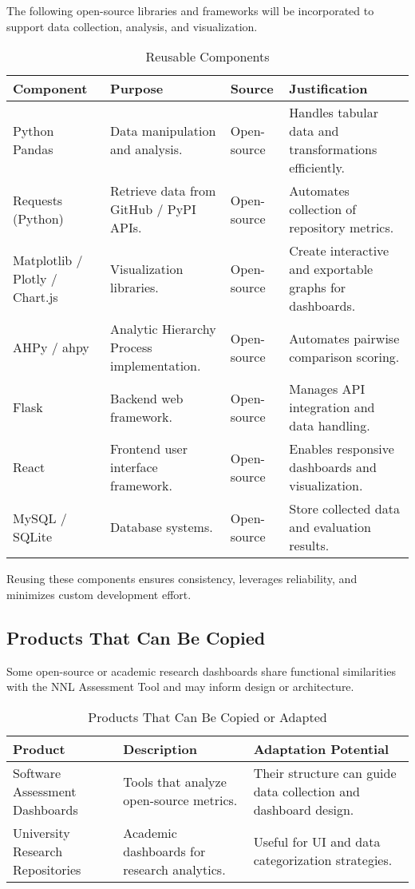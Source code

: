 \documentclass[12pt]{article}
\begin{document}
The following open-source libraries and frameworks will be incorporated to support data collection, analysis, and visualization.

\begin{table}[hp]
\caption{Reusable Components}
\begin{tabularx}{\textwidth}{p{2.8cm}X X X}
\toprule
\textbf{Component} & \textbf{Purpose} & \textbf{Source} & \textbf{Justification} \\
\midrule
Python Pandas & Data manipulation and analysis. & Open-source & Handles tabular data and transformations efficiently. \\
\addlinespace[0.3em]
Requests (Python) & Retrieve data from GitHub / PyPI APIs. & Open-source & Automates collection of repository metrics. \\
\addlinespace[0.3em]
Matplotlib / Plotly / Chart.js & Visualization libraries. & Open-source & Create interactive and exportable graphs for dashboards. \\
\addlinespace[0.3em]
AHPy / ahpy & Analytic Hierarchy Process implementation. & Open-source & Automates pairwise comparison scoring. \\
\addlinespace[0.3em]
Flask & Backend web framework. & Open-source & Manages API integration and data handling. \\
\addlinespace[0.3em]
React & Frontend user interface framework. & Open-source & Enables responsive dashboards and visualization. \\
\addlinespace[0.3em]
MySQL / SQLite & Database systems. & Open-source & Store collected data and evaluation results. \\
\bottomrule
\end{tabularx}
\end{table}

Reusing these components ensures consistency, leverages reliability, and minimizes custom development effort.

\subsection{Products That Can Be Copied}

Some open-source or academic research dashboards share functional similarities with the NNL Assessment Tool and may inform design or architecture.

\begin{table}[hp]
\caption{Products That Can Be Copied or Adapted}
\begin{tabularx}{\textwidth}{p{3cm}X X}
\toprule
\textbf{Product} & \textbf{Description} & \textbf{Adaptation Potential} \\
\midrule
Software Assessment Dashboards & Tools that analyze open-source metrics. & Their structure can guide data collection and dashboard design. \\
\addlinespace[0.3em]
University Research Repositories & Academic dashboards for research analytics. & Useful for UI and data categorization strategies. \\
\bottomrule
\end{tabularx}
\end{table}
\end{document}
